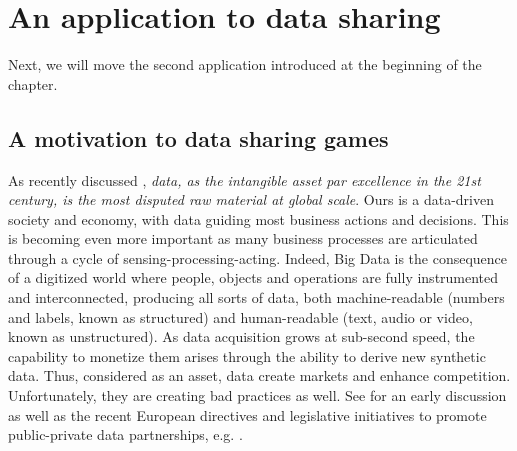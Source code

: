 
\section{An application to data sharing}\label{sec:ds}
Next, we will move the second application introduced at the beginning of the chapter.

\subsection{A motivation to data sharing games}

As recently discussed \cite{wolfram}, {\em data, as the intangible asset par excellence in the 21st century, is the most disputed raw material at global scale}. Ours is a data-driven society and economy,
with  data guiding most business actions and decisions. 
This is becoming even more important as
many business processes are articulated through a 
cycle of sensing-processing-acting. Indeed, Big Data is the
consequence of a digitized world where people, objects and operations are fully instrumented and interconnected, producing all sorts of data, both machine-readable (numbers and labels, known as
structured) and human-readable (text, audio or video, known as unstructured).
As data acquisition grows at sub-second speed, the capability to monetize
them arises through the ability to derive new synthetic data. 
Thus, considered as an asset, data create markets and enhance 
competition. Unfortunately, they are creating bad practices as well.
See \cite{share} for an early discussion 
as well as the 
recent European directives and legislative initiatives to 
promote public-private data partnerships, e.g. \cite{europe1}.


